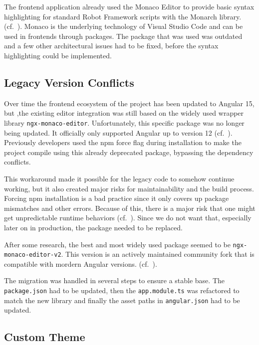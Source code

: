 The frontend application already used the Monaco Editor to provide basic syntax highlighting for standard Robot Framework scripts with the Monarch library. (cf.~\cite{MonacoGithub, MonacoMonarchDocs}). 
Monaco is the underlying technology of Visual Studio Code and can be used in frontends through packages. The package that was used was outdated and a few other architectural issues had to be fixed, before the syntax highlighting could be implemented.

\subsection{Legacy Version Conflicts}

Over time the frontend ecosystem of the project has been updated to Angular 15, but ,the existing editor integration was still based on the widely used wrapper library \texttt{ngx-monaco-editor}. Unfortunately, this specific package was no longer being updated.  It officially only supported Angular up to version 12 (cf.~\cite{DeprecatedNgxMonaco}). Previously developers used the npm force flag during installation to make the project compile using this already deprecated package, bypassing the dependency conflicts.

This workaround made it possible for the legacy code to somehow continue working, but it also created major risks for maintainability and the build process. Forcing npm installation is a bad practice since it only covers up package mismatches and other errors. Because of this, there is a major risk that one might get unpredictable runtime behaviors (cf.~\cite{npmForceDocs}). Since we do not want that, especially later on in production, the package needed to be replaced.

After some research, the best and most widely used package seemed to be \texttt{ngx-monaco-editor-v2}. This version is an actively maintained community fork that is compatible with mordern Angular versions. (cf.~\cite{NgxMonacoEditorV2}).

The migration was handled in several steps to ensure a stable base. The \texttt{package.json} had to be updated, then the \texttt{app.module.ts} was refactored to match the new library and finally the asset paths in \texttt{angular.json} had to be updated.

\subsection{Custom Theme}

